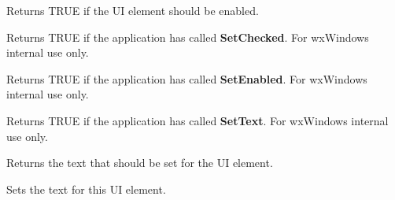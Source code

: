 \label{wxupdateuieventgetenabled}


Returns TRUE if the UI element should be enabled.

\label{wxupdateuieventgetsetchecked}


Returns TRUE if the application has called {\bf SetChecked}. For wxWindows internal use only.

\label{wxupdateuieventgetsetenabled}


Returns TRUE if the application has called {\bf SetEnabled}. For wxWindows internal use only.

\label{wxupdateuieventgetsettext}


Returns TRUE if the application has called {\bf SetText}. For wxWindows internal use only.

\label{wxupdateuieventgettext}


Returns the text that should be set for the UI element.

\label{wxupdateuieventsettext}


Sets the text for this UI element.

